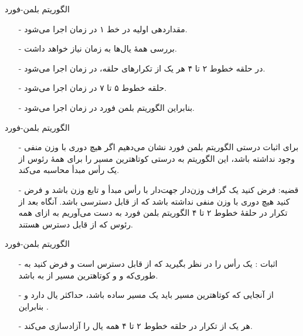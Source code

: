 \begin{frame}{‌الگوریتم بلمن-فورد}
\begin{itemize}\itemr
\item[-]
مقداردهی اولیه در خط ۱ در زمان
اجرا می‌شود.
\item[-]
بررسی همهٔ یال‌ها به زمان 
نیاز خواهد داشت.
\item[-]
در حلقه خطوط ۲ تا ۴ هر یک از
تکرارهای حلقه، در زمان
اجرا می‌شود.
\item[-]
حلقه خطوط ۵ تا ۷ در زمان
اجرا می‌شود.
\item[-]
بنابراین الگوریتم بلمن فورد در زمان
اجرا می‌شود.

\end{itemize}
\end{frame}

\begin{frame}{‌الگوریتم بلمن-فورد}
\begin{itemize}\itemr
\item[-]
برای اثبات درستی الگوریتم بلمن فورد نشان می‌دهیم اگر هیچ دوری با وزن منفی وجود نداشته باشد، این الگوریتم به درستی کوتاهترین مسیر را برای همهٔ رئوس از یک رأس مبدأ محاسبه می‌کند.
\item[-]
قضیه:
فرض کنید
یک گراف وزن‌دار جهت‌دار با رأس مبدأ
و تابع وزن
باشد و فرض کنید
هیچ دوری با وزن منفی نداشته باشد که از
قابل دسترسی باشد. آنگاه بعد از
تکرار در حلقهٔ خطوط ۲ تا ۴ الگوریتم بلمن فورد به دست می‌آوریم
به ازای همه رئوس
که از
قابل دسترس هستند.
\end{itemize}
\end{frame}


\begin{frame}{‌الگوریتم بلمن-فورد}
\begin{itemize}\itemr
\item[-]
اثبات : یک رأس
را در نظر بگیرید که از
قابل دسترس است و فرض کنید
به طوری‌که
و
و
کوتاهترین مسیر از
به
باشد.
\item[-]
از آنجایی که کوتاهترین مسیر باید یک مسیر ساده باشد،
حداکثر
یال دارد و بنابراین
 .
\item[-]
هر یک از
تکرار در حلقه خطوط ۲ تا ۴ همه
یال را آزادسازی می‌کند.
\end{itemize}
\end{frame}


